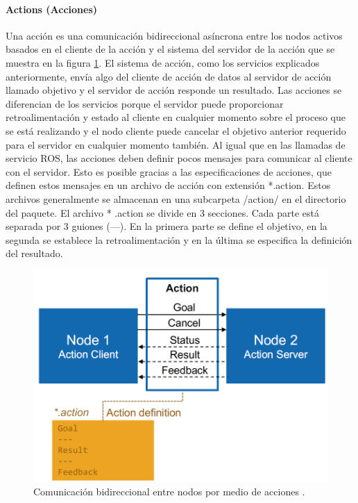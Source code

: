                \newpage

            \paragraph{ Actions (Acciones)}
                    Una acción es una comunicación bidireccional asíncrona entre los nodos activos basados en el cliente de la acción y el sistema del servidor de la acción que se muestra en la figura \ref{f:Cap3_conceptos_11}. El sistema de acción, como los servicios explicados anteriormente, envía algo del cliente de acción de datos al servidor de acción llamado objetivo y el servidor de acción responde un resultado. Las acciones se diferencian de los servicios porque el servidor puede proporcionar retroalimentación y estado al cliente en cualquier momento sobre el proceso que se está realizando y el nodo cliente puede cancelar el objetivo anterior requerido para el servidor en cualquier momento también.
                    Al igual que en las llamadas de servicio ROS, las acciones deben definir pocos mensajes para comunicar al cliente con el servidor. Esto es posible gracias a las especificaciones de acciones, que definen estos mensajes en un archivo de acción con extensión *.action. Estos archivos generalmente se almacenan en una subcarpeta /action/ en el directorio del paquete.
                    El archivo * .action se divide en 3 secciones. Cada parte está separada por 3 guiones (---). En la primera parte se define el objetivo, en la segunda se establece la retroalimentación y en la última se especifica la definición del resultado.

            \begin{figure}[htb]
                \centering
                \includegraphics[width=0.7\linewidth]{Main/Chapter3/Images3/action_diagram.png}
                \caption{Comunicación bidireccional entre nodos por medio de acciones \cite{rosmaster_diagram}.}
                \label{f:Cap3_conceptos_11}
            \end{figure}             

